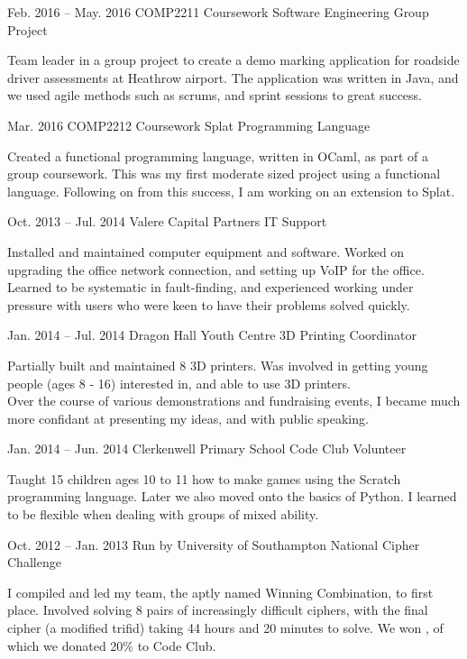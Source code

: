 \documentclass{tccv}
\begin{document}
\begin{eventlist}

\item{Feb. 2016 -- May. 2016}
     {COMP2211 Coursework}
     {Software Engineering Group Project}

Team leader in a group project to create a demo marking application for roadside driver assessments at Heathrow airport. The application was written in Java, and we used agile methods such as scrums, and sprint sessions to great success.

\item{Mar. 2016}
     {COMP2212 Coursework}
     {Splat Programming Language}

Created a functional programming language, written in OCaml, as part of a group coursework. This was my first moderate sized project using a functional language. Following on from this success, I am working on an extension to Splat.

\item{Oct. 2013 -- Jul. 2014}
     {Valere Capital Partners}
     {IT Support}

Installed and maintained computer equipment and software. Worked on upgrading the office network connection, and setting up VoIP for the office. Learned to be systematic in fault-finding, and experienced working under pressure with users who were keen to have their problems solved quickly.

\item{Jan. 2014 -- Jul. 2014}
     {Dragon Hall Youth Centre}
     {3D Printing Coordinator}

Partially built and maintained 8 3D printers. Was involved in getting young people (ages 8 - 16) interested in, and able to use 3D printers.\\
Over the course of various demonstrations and fundraising events, I became much more confidant at presenting my ideas, and with public speaking.

\item{Jan. 2014 -- Jun. 2014}
     {Clerkenwell Primary School}
     {Code Club Volunteer}

Taught 15 children ages 10 to 11 how to make games using the Scratch programming language. Later we also moved onto the basics of Python. I learned to be flexible when dealing with groups of mixed ability.

\item{Oct. 2012 -- Jan. 2013}
     {Run by University of Southampton}
     {National Cipher Challenge}
     
I compiled and led my team, the aptly named Winning Combination, to first place. Involved solving 8 pairs of increasingly difficult ciphers, with the final cipher (a modified trifid) taking 44 hours and 20 minutes to solve. We won , of which we donated 20\% to Code Club.

\end{eventlist}
\end{document}
